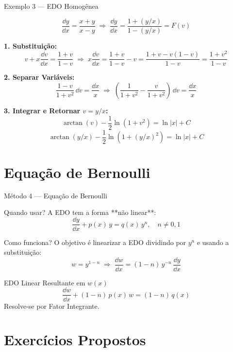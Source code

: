 \documentclass[11pt, aspectratio=169, xcolor=table]{beamer}
\begin{document}
\begin{frame}{Exemplo 3 --- EDO Homogênea}

\[
\frac{\dd y}{\dd x} = \frac{x+y}{x-y} \;\Longrightarrow\; \frac{\dd y}{\dd x} = \frac{1+(y/x)}{1-(y/x)} = F(v)
\]

\textbf{1. Substituição:}
\[
v + x\frac{\dd v}{\dd x} = \frac{1+v}{1-v} \;\Longrightarrow\; x\frac{\dd v}{\dd x} = \frac{1+v}{1-v} - v = \frac{1+v - v(1-v)}{1-v} = \frac{1+v^2}{1-v}
\]

\textbf{2. Separar Variáveis:}
\[
\frac{1-v}{1+v^2}\,\dd v = \frac{\dd x}{x} \;\Longrightarrow\; \left( \frac{1}{1+v^2} - \frac{v}{1+v^2} \right)\,\dd v = \frac{\dd x}{x}
\]
\end{frame}

\begin{frame}
\textbf{3. Integrar e Retornar $v=y/x$:}
\[
\arctan(v) - \frac{1}{2}\ln(1+v^2) = \ln|x| + C
\]
\[
\boxed{\arctan(y/x) - \frac{1}{2}\ln(1+(y/x)^2) = \ln|x| + C}
\]
\end{frame}

\section{Equação de Bernoulli}

\begin{frame}{Método 4 --- Equação de Bernoulli}
\begin{block}{Quando usar?}
A EDO tem a forma **não linear**:
\[
\frac{\dd y}{\dd x} + p(x)\,y = q(x)\,y^n,\quad n\neq 0,1
\]
\end{block}

\begin{alertblock}{Como funciona?}
O objetivo é linearizar a EDO dividindo por $y^n$ e usando a substituição:
\[
w = y^{1-n} \;\Longrightarrow\; \frac{\dd w}{\dd x} = (1-n)\,y^{-n}\,\frac{\dd y}{\dd x}
\]
\end{alertblock}
\end{frame}

\begin{frame}
\begin{block}{EDO Linear Resultante em $w(x)$}
\[
\frac{\dd w}{\dd x} + (1-n)\,p(x)\,w = (1-n)\,q(x)
\]
Resolve-se por Fator Integrante.
\end{block}
\end{frame}

\section{Exercícios Propostos}
\end{document}
